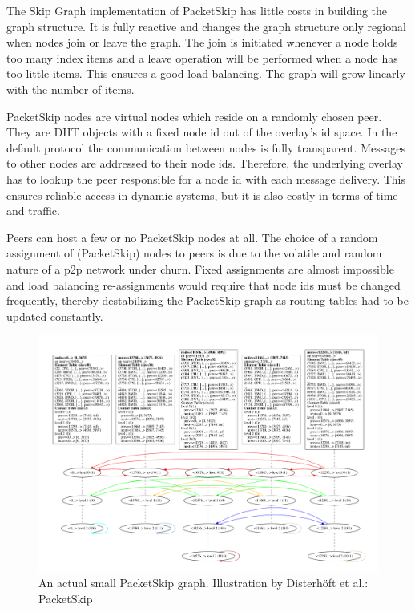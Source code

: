 The Skip Graph implementation of PacketSkip has little costs in building the graph structure. It is fully reactive and changes the graph structure only regional when nodes join or leave the graph. The join is initiated whenever a node holds too many index items and a leave operation will be performed when a node has too little items. This ensures a good load balancing. The graph will grow linearly with the number of items.

PacketSkip nodes are virtual nodes which reside on a randomly chosen peer. They are DHT objects with a fixed node id out of the overlay's id space. In the default protocol the communication between nodes is fully transparent. Messages to other nodes are addressed to their node ids. Therefore, the underlying overlay has to lookup the peer responsible for a node id with each message delivery. This ensures reliable access in dynamic systems, but it is also costly in terms of time and traffic.

Peers can host a few or no PacketSkip nodes at all. The choice of a random assignment of (PacketSkip) nodes to peers is due to the volatile and random nature of a p2p network under churn. Fixed assignments are almost impossible and load balancing re-assignments would require that node ids must be changed frequently, thereby destabilizing the PacketSkip graph as routing tables had to be updated constantly.

\begin{figure}[t]
	\centering
	\includegraphics[width=\textwidth]{graphics/packetskipgraph_reduced}%
	\vspace{-0.3cm}
	\caption{An actual small PacketSkip graph. Illustration by Disterh{\"o}ft et al.: PacketSkip~\cite{packetskip10}}
	\label{fig:packetskipgraph}
	\vspace{-0.3cm}
\end{figure}

